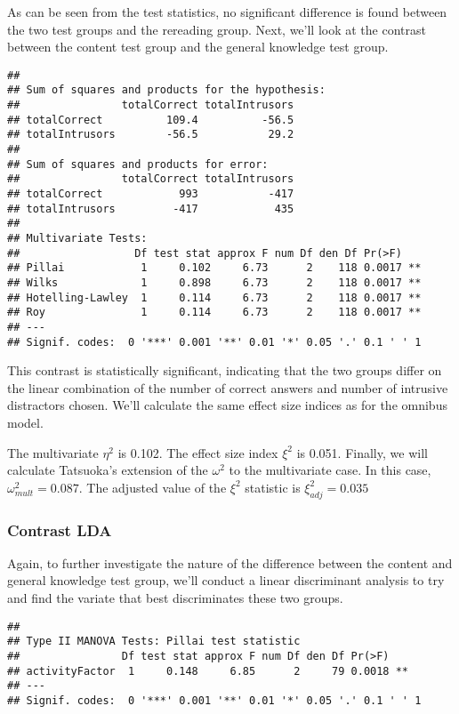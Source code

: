 \documentclass[11pt,]{article}
\begin{document}
As can be seen from the test statistics, no significant difference is
found between the two test groups and the rereading group. Next, we'll
look at the contrast between the content test group and the general
knowledge test group.

\begin{verbatim}
## 
## Sum of squares and products for the hypothesis:
##                totalCorrect totalIntrusors
## totalCorrect          109.4          -56.5
## totalIntrusors        -56.5           29.2
## 
## Sum of squares and products for error:
##                totalCorrect totalIntrusors
## totalCorrect            993           -417
## totalIntrusors         -417            435
## 
## Multivariate Tests: 
##                  Df test stat approx F num Df den Df Pr(>F)   
## Pillai            1     0.102     6.73      2    118 0.0017 **
## Wilks             1     0.898     6.73      2    118 0.0017 **
## Hotelling-Lawley  1     0.114     6.73      2    118 0.0017 **
## Roy               1     0.114     6.73      2    118 0.0017 **
## ---
## Signif. codes:  0 '***' 0.001 '**' 0.01 '*' 0.05 '.' 0.1 ' ' 1
\end{verbatim}

This contrast is statistically significant, indicating that the two
groups differ on the linear combination of the number of correct answers
and number of intrusive distractors chosen. We'll calculate the same
effect size indices as for the omnibus model.

The multivariate \(\eta^2\) is 0.102. The effect size index \(\xi^2\) is
0.051. Finally, we will calculate Tatsuoka's
\citep[1970; according to][]{hubertyAppliedMANOVADiscriminant2006}
extension of the \(\omega^2\) to the multivariate case. In this case,
\(\omega^2_{mult} = 0.087\). The adjusted value of the \(\xi^2\)
statistic is \(\xi^2_{adj} = 0.035\)

\hypertarget{contrast-lda}{%
\subsubsection{Contrast LDA}\label{contrast-lda}}

Again, to further investigate the nature of the difference between the
content and general knowledge test group, we'll conduct a linear
discriminant analysis to try and find the variate that best
discriminates these two groups.

\begin{verbatim}
## 
## Type II MANOVA Tests: Pillai test statistic
##                Df test stat approx F num Df den Df Pr(>F)   
## activityFactor  1     0.148     6.85      2     79 0.0018 **
## ---
## Signif. codes:  0 '***' 0.001 '**' 0.01 '*' 0.05 '.' 0.1 ' ' 1
\end{verbatim}
\end{document}
